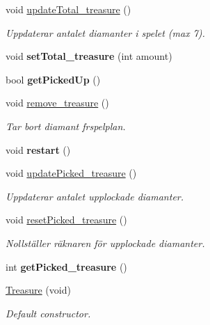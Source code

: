\begin{DoxyCompactItemize}
\item 
void \hyperlink{class_treasure_a4adfbdd7f6836055e45799109900b967}{updateTotal\_\-treasure} ()
\begin{DoxyCompactList}\small\item\em Uppdaterar antalet diamanter i spelet (max 7). \item\end{DoxyCompactList}\item 
\hypertarget{class_treasure_a3bab1a60b9be4238a7e8e87ebea518bf}{
void {\bfseries setTotal\_\-treasure} (int amount)}
\label{class_treasure_a3bab1a60b9be4238a7e8e87ebea518bf}

\item 
\hypertarget{class_treasure_a753f724453fda354c6096c89e45c4eec}{
bool {\bfseries getPickedUp} ()}
\label{class_treasure_a753f724453fda354c6096c89e45c4eec}

\item 
void \hyperlink{class_treasure_af736621c70a28836a8d2d5e99f6aeeeb}{remove\_\-treasure} ()
\begin{DoxyCompactList}\small\item\em Tar bort diamant fr\aan spelplan. \item\end{DoxyCompactList}\item 
\hypertarget{class_treasure_abf55a294daa994e8da74cde368a3c862}{
void {\bfseries restart} ()}
\label{class_treasure_abf55a294daa994e8da74cde368a3c862}

\item 
void \hyperlink{class_treasure_a9404782e0c574fbb12b4fdac0727ff42}{updatePicked\_\-treasure} ()
\begin{DoxyCompactList}\small\item\em Uppdaterar antalet upplockade diamanter. \item\end{DoxyCompactList}\item 
void \hyperlink{class_treasure_a13a597f8b516e5234d190a3a3e5c379c}{resetPicked\_\-treasure} ()
\begin{DoxyCompactList}\small\item\em Nollst\"{a}ller r\"{a}knaren f\"{o}r upplockade diamanter. \item\end{DoxyCompactList}\item 
\hypertarget{class_treasure_aa5bf79236d342031dc20145bb189343e}{
int {\bfseries getPicked\_\-treasure} ()}
\label{class_treasure_aa5bf79236d342031dc20145bb189343e}

\item 
\hyperlink{class_treasure_abd7b4ecec1e73e944892862e9c233dd6}{Treasure} (void)
\begin{DoxyCompactList}\small\item\em Default constructor. \item\end{DoxyCompactList}\end{DoxyCompactItemize}


